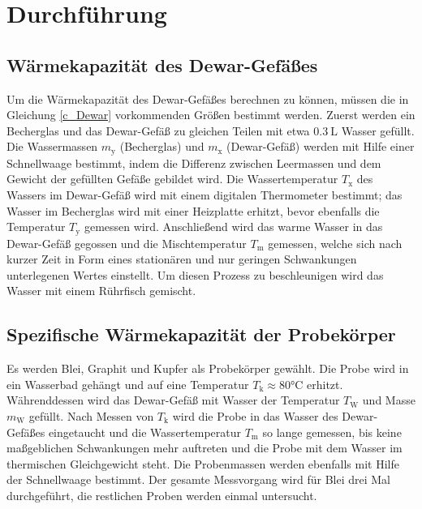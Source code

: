 \section{Durchführung}
\label{sec:Durchfuehrung}
\subsection{Wärmekapazität des Dewar-Gefäßes}
Um die Wärmekapazität des Dewar-Gefäßes berechnen zu können, müssen die in Gleichung \eqref{c_Dewar} vorkommenden Größen bestimmt werden.
Zuerst werden ein Becherglas und das Dewar-Gefäß zu gleichen Teilen mit etwa $\SI{0.3}{\liter}$ Wasser gefüllt. 
Die Wassermassen $m_\mathup{y}$ (Becherglas) und $m_\mathup{x}$ (Dewar-Gefäß) werden mit Hilfe einer Schnellwaage bestimmt, indem die Differenz zwischen Leermassen und dem Gewicht der gefüllten Gefäße gebildet wird.
Die Wassertemperatur $T_\mathup{x}$ des Wassers im Dewar-Gefäß wird mit einem digitalen Thermometer bestimmt; das Wasser im Becherglas wird mit einer Heizplatte erhitzt, bevor ebenfalls die Temperatur $T_\mathup{y}$ gemessen wird. 
Anschließend wird das warme Wasser in das Dewar-Gefäß gegossen und die Mischtemperatur $T_\mathup{m}$ gemessen, welche sich nach kurzer Zeit in Form eines stationären und nur geringen Schwankungen unterlegenen Wertes einstellt.  
Um diesen Prozess zu beschleunigen wird das Wasser mit einem Rührfisch gemischt.

\subsection{Spezifische Wärmekapazität der Probekörper}
Es werden Blei, Graphit und Kupfer als Probekörper gewählt.
Die Probe wird in ein Wasserbad gehängt und auf eine Temperatur $T_\mathup{k}\approx80\si\celsius$ erhitzt. 
Währenddessen wird das Dewar-Gefäß mit Wasser der Temperatur $T_\mathup{W}$ und Masse $m_\mathup{W}$ gefüllt. 
Nach Messen von $T_\mathup{k}$ wird die Probe in das Wasser des Dewar-Gefäßes eingetaucht und die Wassertemperatur $T_\mathup{m}$ so lange gemessen, bis keine maßgeblichen Schwankungen mehr auftreten und die Probe mit dem Wasser im thermischen Gleichgewicht steht.
Die Probenmassen werden ebenfalls mit Hilfe der Schnellwaage bestimmt.
Der gesamte Messvorgang wird für Blei drei Mal durchgeführt, die restlichen Proben werden einmal untersucht.
